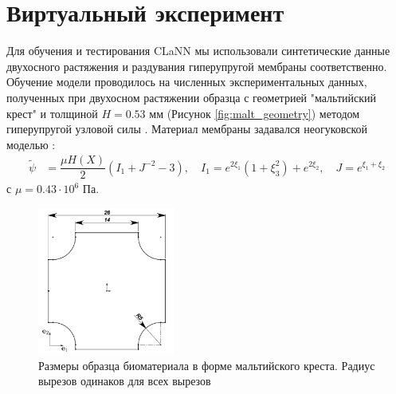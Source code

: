 \section{Виртуальный эксперимент}

Для обучения и тестирования CLaNN мы использовали синтетические  данные двухосного растяжения и раздувания гиперупругой мембраны соответственно.
Обучение модели проводилось на численных экспериментальных данных, 
полученных при двухосном растяжении образца с геометрией "мальтийский крест" и толщиной $H=0.53$ мм (Рисунок \ref{fig:malt_geometry}) методом гиперупругой узловой силы \cite{ddaniso2024}. 
Материал мембраны задавался неогуковской моделью \cite{ogden1997nonlinear}:
\begin{align} \label{eq:neohook}
        \widetilde{\psi} &= \dfrac{\mu H(X)}{2} (I_1 +J^{-2}-3),
        \quad     I_1 = e^{2\xi_1} (1+\xi_3^2)+e^{2\xi_2},\quad J = e^{\xi_1+\xi_2}
\end{align}
с $\mu=0.43\cdot 10^6$ Па.



\begin{figure}[H]
  \centering
  \includegraphics[width=0.4\textwidth]{img/malt_geom.png}
  \caption{Размеры образца биоматериала в форме мальтийского креста. 
  Радиус вырезов одинаков для всех вырезов}
  \label{fig:malt_geometry}
  \label{fig:malt_displacements}
\end{figure}

